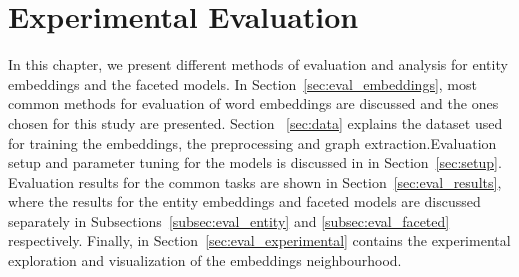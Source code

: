 \chapter{Experimental Evaluation}
\label{chap:eval}
In this chapter, we present different methods of evaluation and analysis for entity embeddings and the faceted models. In Section~\ref{sec:eval_embeddings}, most common methods for evaluation of word embeddings are discussed and the ones chosen for this study are presented. Section ~\ref{sec:data} explains the dataset used for training the embeddings, the preprocessing and graph extraction.Evaluation setup and parameter tuning for the models is discussed in in Section~\ref{sec:setup}. Evaluation results for the common tasks are shown in Section~\ref{sec:eval_results}, where the results for the entity embeddings and faceted models are discussed separately in Subsections~\ref{subsec:eval_entity} and \ref{subsec:eval_faceted} respectively. Finally, in Section~\ref{sec:eval_experimental} contains the experimental exploration and visualization of the embeddings neighbourhood. 
